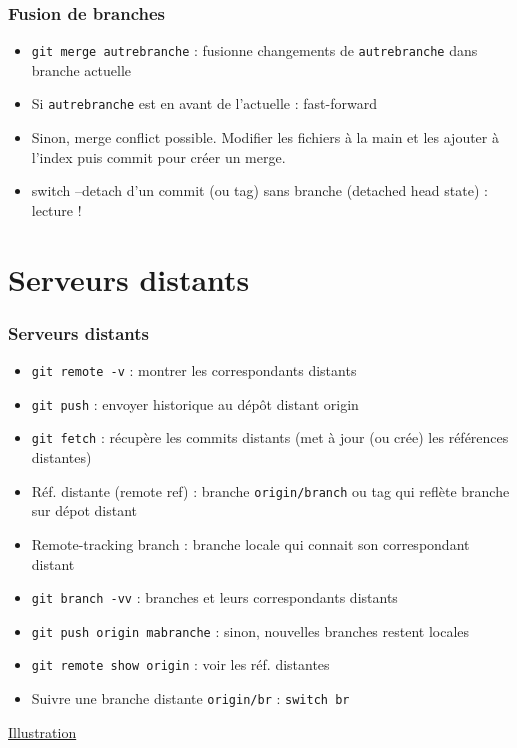 \documentclass[english, french]{beamer}
\begin{document}
\begin{frame}
	\frametitle{Fusion de branches}
	{
	\centering
	\par
	}
	\begin{itemize}
		\item \texttt{git merge autrebranche} : fusionne changements de \texttt{autrebranche} dans branche actuelle
		\item Si \texttt{autrebranche} est en avant de l’actuelle : \og{}fast-forward\fg{}
		\item Sinon, \og{}merge conflict\fg{} possible. Modifier les fichiers à la main et les ajouter à l’index puis commit pour créer un merge. 
		\item switch --detach d’un commit {\tiny (ou tag)} sans branche {\tiny (detached head state)} : lecture !
	\end{itemize}
\end{frame}

\section{Serveurs distants}
\begin{frame}
	\frametitle{Serveurs distants}
	\begin{itemize}
		\item \texttt{git remote -v} : montrer les correspondants distants
		\item \texttt{git push} : envoyer historique au dépôt distant origin
		\item \texttt{git fetch} : récupère les commits distants (met à jour (ou crée) les références distantes)
		\item Réf. distante (\og{}remote ref\fg{}) : branche \texttt{origin/branch} {\tiny ou tag} qui reflète branche sur dépot distant
		\item \og{}Remote-tracking branch\fg{} : branche locale qui connait son correspondant distant
		\item \texttt{git branch -vv} : branches et leurs correspondants distants
		\item \texttt{git push origin mabranche} : sinon, nouvelles branches restent locales
		\item \texttt{git remote show origin} : voir les réf. distantes
		\item Suivre une branche distante \texttt{origin/br} : \texttt{switch br}
	\end{itemize}
	\href{https://onlywei.github.io/explain-git-with-d3/\#fetch}{Illustration}
\end{frame}
\end{document}
